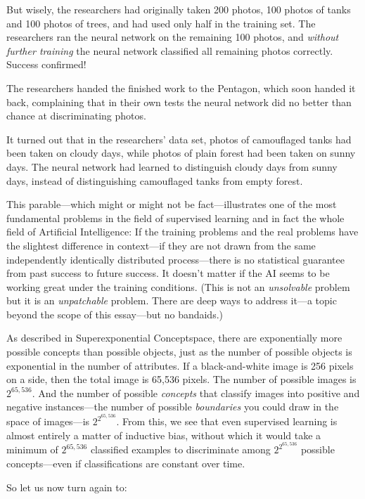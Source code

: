  But wisely, the researchers had originally taken 200 photos, 100
photos of tanks and 100 photos of trees, and had used only half in the
training set. The researchers ran the neural network on the remaining
100 photos, and \textit{without further training} the neural network
classified all remaining photos correctly. Success confirmed!


 The researchers handed the finished work to the Pentagon, which
soon handed it back, complaining that in their own tests the neural
network did no better than chance at discriminating photos.


 It turned out that in the researchers' data set,
photos of camouflaged tanks had been taken on cloudy days, while photos
of plain forest had been taken on sunny days. The neural network had
learned to distinguish cloudy days from sunny days, instead of
distinguishing camouflaged tanks from empty forest.


 This parable---which might or might not be fact---illustrates one
of the most fundamental problems in the field of supervised learning
and in fact the whole field of Artificial Intelligence: If the training
problems and the real problems have the slightest difference in
context---if they are not drawn from the same independently identically
distributed process---there is no statistical guarantee from past
success to future success. It doesn't matter if the AI
seems to be working great under the training conditions. (This is not
an \textit{unsolvable} problem but it is an \textit{unpatchable}
problem. There are deep ways to address it---a topic beyond the scope
of this essay---but no bandaids.)


 As described in Superexponential Conceptspace, there are
exponentially more possible concepts than possible objects, just as the
number of possible objects is exponential in the number of attributes.
If a black-and-white image is 256 pixels on a side, then the total
image is 65,536 pixels. The number of possible images is
$2^{65,536}$. And the number of possible \textit{concepts}
that classify images into positive and negative instances---the number
of possible \textit{boundaries} you could draw in the space of
images---is $2^{2^{65,536}}$. From this, we see that even
supervised learning is almost entirely a matter of inductive bias,
without which it would take a minimum of $2^{65,536}$
classified examples to discriminate among $2^{2^{65,536}}$
possible concepts---even if classifications are constant over time.


 So let us now turn again to:

